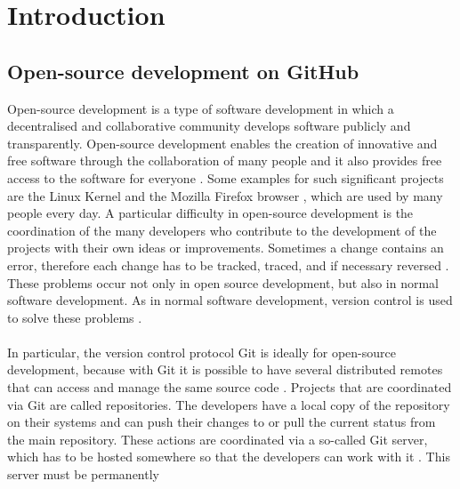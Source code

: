 \documentclass[sigconf]{acmart}
\begin{document}
\maketitle
\pagestyle{plain}


\section{Introduction}
\subsection{Open-source development on GitHub}
Open-source development is a type of software development in which a decentralised and collaborative 
community develops software publicly and transparently. Open-source development enables the creation 
of innovative and free software through the collaboration of many people and it also provides free access 
to the software for everyone \cite{shaikh2017governing, redhat2021ops}. Some examples for such significant 
projects are the Linux Kernel \cite{linux2021ops} and the Mozilla Firefox browser \cite{mozilla2021ops}, which are 
used by many people  every day. A particular difficulty in open-source development is the coordination of the many 
developers who contribute to the development of the projects with their own ideas or improvements. Sometimes a 
change contains an error, therefore each change has
to be tracked, traced, and if necessary reversed   \cite{shaikh2017governing}. These problems occur not only in open 
source development, but also in normal software development. As in normal software development, version control is 
used to solve these problems \cite{shaikh2017governing, ulrich2020dev}. \\ \\
In particular, the version control protocol Git 
is ideally for open-source development, because with Git it is possible to have several distributed remotes that can 
access and manage the same source code \cite{git2021scm, ulrich2020dev}. Projects that are coordinated via Git are 
called repositories. The developers have a local copy of the repository on their systems and can push their changes to or 
pull the current status from the main repository. These actions are coordinated via a so-called Git server, which has to be 
hosted somewhere so that the developers can work with it \cite{git2021scm}. This server must be permanently
\end{document}
